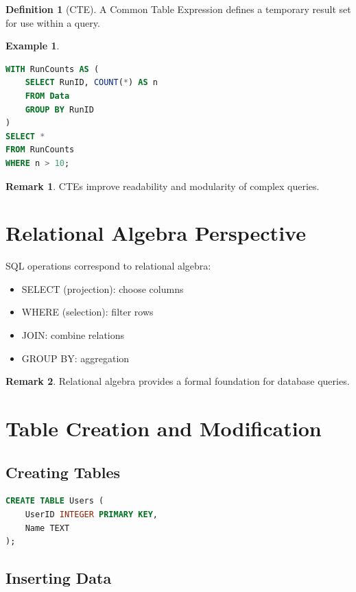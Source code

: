 \documentclass[12pt,oneside]{book}
\numberwithin{equation}{section}
\theoremstyle{definition}
\newtheorem{definition}{Definition}[section]
\newtheorem{example}{Example}[section]
\newtheorem{remark}{Remark}[section]
\theoremstyle{plain}
\theoremstyle{remark}
\begin{document}
\begin{definition}[CTE]
A Common Table Expression defines a temporary result set for use within a query.
\end{definition}

\begin{example}
\begin{lstlisting}[language=SQL]
WITH RunCounts AS (
    SELECT RunID, COUNT(*) AS n
    FROM Data
    GROUP BY RunID
)
SELECT *
FROM RunCounts
WHERE n > 10;
\end{lstlisting}
\end{example}

\begin{remark}
CTEs improve readability and modularity of complex queries.
\end{remark}

\section{Relational Algebra Perspective}

SQL operations correspond to relational algebra:

\begin{itemize}
    \item SELECT (projection): choose columns
    \item WHERE (selection): filter rows
    \item JOIN: combine relations
    \item GROUP BY: aggregation
\end{itemize}

\begin{remark}
Relational algebra provides a formal foundation for database queries.
\end{remark}

\section{Table Creation and Modification}

\subsection{Creating Tables}

\begin{lstlisting}[language=SQL]
CREATE TABLE Users (
    UserID INTEGER PRIMARY KEY,
    Name TEXT
);
\end{lstlisting}

\subsection{Inserting Data}
\end{document}
